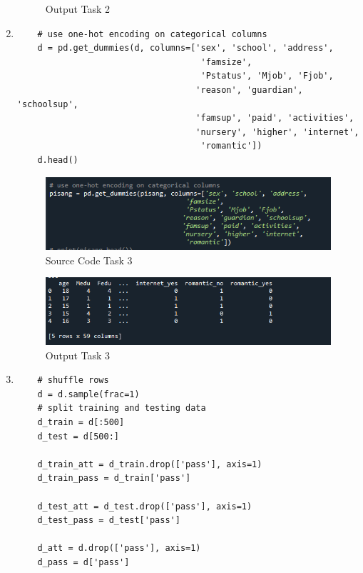 \begin{enumerate}
\begin{figure}[h]
    \caption{Output Task 2}
    \label{fig:mesh1}
\end{figure}
\item
\begin{verbatim}
	# use one-hot encoding on categorical columns
	d = pd.get_dummies(d, columns=['sex', 'school', 'address', 
									'famsize', 
									'Pstatus', 'Mjob', 'Fjob', 
	                               'reason', 'guardian', 'schoolsup', 
								   'famsup', 'paid', 'activities',
	                               'nursery', 'higher', 'internet', 
									'romantic'])
	d.head()
\end{verbatim}
\newpage
\begin{figure}[h]
    \centering
    \includegraphics[scale=0.6]{figures/chapter 2/sklearn/5.png}
    \caption{Source Code Task 3}
    \label{fig:mesh1}
\end{figure}
\begin{figure}[h]
    \centering
    \includegraphics[scale=0.6]{figures/chapter 2/sklearn/6.png}
    \caption{Output Task 3}
    \label{fig:mesh1}
\end{figure}
\newpage
\item
\begin{verbatim}
	# shuffle rows
	d = d.sample(frac=1)
	# split training and testing data
	d_train = d[:500]
	d_test = d[500:]

	d_train_att = d_train.drop(['pass'], axis=1)
	d_train_pass = d_train['pass']

	d_test_att = d_test.drop(['pass'], axis=1)
	d_test_pass = d_test['pass']

	d_att = d.drop(['pass'], axis=1)
	d_pass = d['pass']


\end{verbatim}
\end{enumerate}
